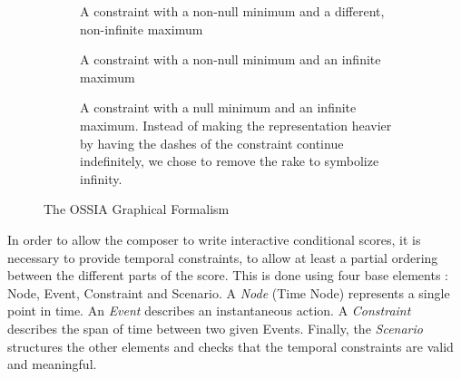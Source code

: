 \documentclass{article}
\begin{document}
\begin{figure}[!t]
\begin{subfigure}[b]{0.9\columnwidth}
\begin{tikzpicture}
	    \end{tikzpicture}
	    \caption{A constraint with a non-null minimum and a different, non-infinite maximum}
	\end{subfigure}
	
	\begin{subfigure}[b]{0.9\columnwidth}
		\centering		
		\caption{A constraint with a non-null minimum and an infinite maximum}
	\end{subfigure} 
	
	\begin{subfigure}[b]{0.9\columnwidth}
		\centering
		\caption{A constraint with a null minimum and an infinite maximum. Instead of making the representation heavier by having the dashes of the constraint continue indefinitely, we chose to remove the rake to symbolize infinity.}
	\end{subfigure}

	\caption{The OSSIA Graphical Formalism}
	\label{fig.graphical}
	\end{figure}
	
	In order to allow the composer to write interactive conditional scores, it is necessary to provide temporal constraints, to allow at least a partial ordering between the different parts of the score. This is done using four base elements : Node, Event, Constraint and Scenario. A \emph{Node} (Time Node) represents a single point in time. An \emph{Event} describes an instantaneous action. A \emph{Constraint} describes the span of time between two given Events.	Finally, the \emph{Scenario} structures the other elements and checks that the temporal constraints are valid and meaningful.
\end{document}
